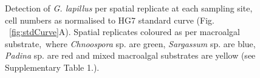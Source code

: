\documentclass[12pt]{article}
\begin{document}
\FloatBarrier 
\begin{figure} 
\caption{Detection of \emph{G. lapillus} per spatial replicate at each sampling site, cell numbers as normalised to HG7 standard curve (Fig. ~\ref{fig:stdCurve}A). Spatial replicates coloured as per macroalgal substrate,\ where \emph{Chnoospora} sp. are green, \emph{Sargassum} sp. are blue, \emph{Padina} sp. are red and mixed macroalgal substrates are yellow (see Supplementary Table 1.).} 
\label{fig:envHG7}
\end{figure} 
\FloatBarrier



\newpage


\end{document}
